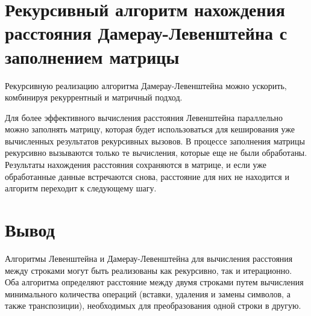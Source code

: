 \section{Рекурсивный алгоритм нахождения расстояния Дамерау-Левенштейна с заполнением матрицы}
\label{sec:recmat}

Рекурсивную реализацию алгоритма Дамерау-Левенштейна можно ускорить, комбинируя рекуррентный и матричный подход.

Для более эффективного вычисления расстояния Левенштейна параллельно можно заполнять матрицу, которая будет использоваться для кеширования уже вычисленных результатов рекурсивных вызовов. В процессе заполнения матрицы рекурсивно вызываются только те вычисления, которые еще не были обработаны. Результаты нахождения расстояния сохраняются в матрице, и если уже обработанные данные встречаются снова, расстояние для них не находится и алгоритм переходит к следующему шагу.

\section*{Вывод}

Алгоритмы Левенштейна и Дамерау-Левенштейна для вычисления расстояния между строками могут быть реализованы как рекурсивно, так и итерационно. Оба алгоритма определяют расстояние между двумя строками путем вычисления минимального количества операций (вставки, удаления и замены символов, а также транспозиции), необходимых для преобразования одной строки в другую.

\pagebreak

